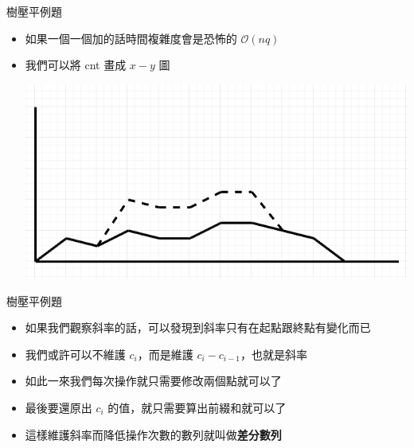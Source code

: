 \documentclass[aspectratio=169]{beamer}
\begin{document}
    \begin{frame}{樹壓平例題}
        \begin{itemize}
            \item<1-> 如果一個一個加的話時間複雜度會是恐怖的 $\mathcal{O}(nq)$
            \item<2-> 我們可以將 cnt 畫成 $x-y$ 圖
            \begin{center}
                \includegraphics[height=0.6\textheight]{src/abc187e.png}
            \end{center}
        \end{itemize}
    \end{frame}

    \begin{frame}{樹壓平例題}
        \begin{itemize}
            \item<1-> 如果我們觀察斜率的話，可以發現到斜率只有在起點跟終點有變化而已
            \item<2-> 我們或許可以不維護 $c_i$，而是維護 $c_i - c_{i-1}$，也就是斜率
            \item<2-> 如此一來我們每次操作就只需要修改兩個點就可以了
            \item<3-> 最後要還原出 $c_i$ 的值，就只需要算出前綴和就可以了
            \item<3-> 這樣維護斜率而降低操作次數的數列就叫做\textbf{差分數列}
        \end{itemize}
    \end{frame}
\end{document}
